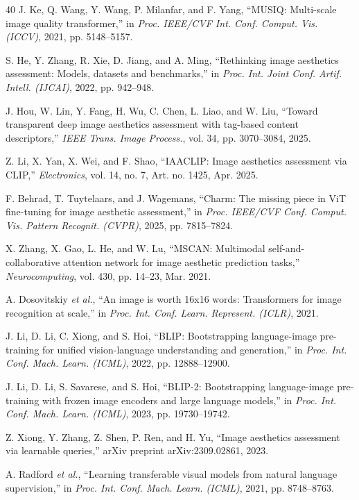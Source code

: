 \documentclass[journal]{IEEEtran}
\begin{document}
\begin{thebibliography}{40}
J. Ke, Q. Wang, Y. Wang, P. Milanfar, and F. Yang, ``MUSIQ: Multi-scale image quality transformer,'' in \emph{Proc. IEEE/CVF Int. Conf. Comput. Vis. (ICCV)}, 2021, pp. 5148--5157.

S. He, Y. Zhang, R. Xie, D. Jiang, and A. Ming, ``Rethinking image aesthetics assessment: Models, datasets and benchmarks,'' in \emph{Proc. Int. Joint Conf. Artif. Intell. (IJCAI)}, 2022, pp. 942--948.

J. Hou, W. Lin, Y. Fang, H. Wu, C. Chen, L. Liao, and W. Liu, ``Toward transparent deep image aesthetics assessment with tag-based content descriptors,'' \emph{IEEE Trans. Image Process.}, vol. 34, pp. 3070--3084, 2025.

Z. Li, X. Yan, X. Wei, and F. Shao, ``IAACLIP: Image aesthetics assessment via CLIP,'' \emph{Electronics}, vol. 14, no. 7, Art. no. 1425, Apr. 2025.

F. Behrad, T. Tuytelaars, and J. Wagemans, ``Charm: The missing piece in ViT fine-tuning for image aesthetic assessment,'' in \emph{Proc. IEEE/CVF Conf. Comput. Vis. Pattern Recognit. (CVPR)}, 2025, pp. 7815--7824.

X. Zhang, X. Gao, L. He, and W. Lu, ``MSCAN: Multimodal self-and-collaborative attention network for image aesthetic prediction tasks,'' \emph{Neurocomputing}, vol. 430, pp. 14--23, Mar. 2021.

A. Dosovitskiy \emph{et al.}, ``An image is worth 16x16 words: Transformers for image recognition at scale,'' in \emph{Proc. Int. Conf. Learn. Represent. (ICLR)}, 2021.

J. Li, D. Li, C. Xiong, and S. Hoi, ``BLIP: Bootstrapping language-image pre-training for unified vision-language understanding and generation,'' in \emph{Proc. Int. Conf. Mach. Learn. (ICML)}, 2022, pp. 12888--12900.

J. Li, D. Li, S. Savarese, and S. Hoi, ``BLIP-2: Bootstrapping language-image pre-training with frozen image encoders and large language models,'' in \emph{Proc. Int. Conf. Mach. Learn. (ICML)}, 2023, pp. 19730--19742.

Z. Xiong, Y. Zhang, Z. Shen, P. Ren, and H. Yu, ``Image aesthetics assessment via learnable queries,'' arXiv preprint arXiv:2309.02861, 2023.

A. Radford \emph{et al.}, ``Learning transferable visual models from natural language supervision,'' in \emph{Proc. Int. Conf. Mach. Learn. (ICML)}, 2021, pp. 8748--8763.


\end{thebibliography}
\end{document}
